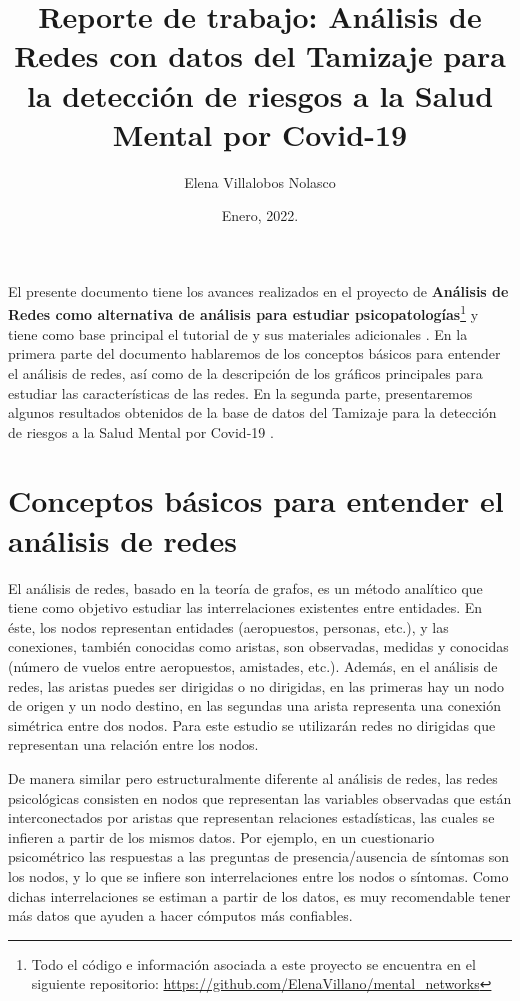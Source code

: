 \documentclass[11pt,spanish]{article}\usepackage[]{graphicx}\usepackage[]{color}
\title{\huge{Reporte de trabajo: Análisis de Redes con datos del Tamizaje para la detección de riesgos a la Salud Mental por Covid-19}}
\author[ ]{Elena Villalobos Nolasco}
\date{Enero, 2022.}
\begin{document}
\maketitle


El presente documento tiene los avances realizados en el proyecto de {\bf Análisis de Redes como alternativa de análisis para estudiar psicopatologías}\footnote{Todo el código e información asociada a este proyecto se encuentra en el siguiente repositorio: \url{https://github.com/ElenaVillano/mental_networks}} y tiene como base principal el tutorial de \cite{main_tutorial} y sus materiales adicionales \citep{epskamp2018estimating}. En la primera parte del documento hablaremos de los conceptos básicos para entender el análisis de redes, así como de la descripción de los gráficos principales para estudiar las características de las redes. En la segunda parte, presentaremos algunos resultados obtenidos de la base de datos del Tamizaje para la detección de riesgos a la Salud Mental por Covid-19 \citep{morales2021mental, chaine2020condiciones}. 


\section{Conceptos básicos para entender el análisis de redes}

El análisis de redes, basado en la teoría de grafos, es un método analítico que tiene como objetivo estudiar las interrelaciones existentes entre entidades. En éste, los nodos representan entidades (aeropuestos, personas, etc.), y las conexiones, también conocidas como aristas, son observadas, medidas y conocidas (número de vuelos entre aeropuestos, amistades, etc.). Además, en el análisis de redes, las aristas puedes ser dirigidas o no dirigidas, en las primeras hay un nodo de origen y un nodo destino, en las segundas una arista representa una conexión simétrica entre dos nodos. Para este estudio se utilizarán redes no dirigidas que representan una relación entre los nodos. 

De manera similar pero estructuralmente diferente al análisis de redes, las redes psicológicas consisten en nodos que representan las variables observadas que están interconectados por aristas que representan relaciones estadísticas, las cuales se infieren a partir de los mismos datos. Por ejemplo, en un cuestionario psicométrico las respuestas a las preguntas de presencia/ausencia de síntomas son los nodos, y lo que se infiere son interrelaciones entre los nodos o síntomas. Como dichas interrelaciones se estiman a partir de los datos, es muy recomendable tener más datos que ayuden a hacer cómputos más confiables.
\end{document}

